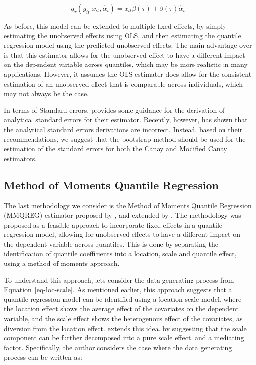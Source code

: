 \documentclass[bib]{statapress}
\begin{document}
\[q_{\tau}(y_{it}|x_{it},\hat \alpha_i) =  x_{it}\beta(\tau)+\beta(\tau) \hat\alpha_i
\]

As before, this model can be extended to multiple fixed effects, by
simply estimating the unobserved effects using OLS, and then estimating
the quantile regression model using the predicted unobserved effects.
The main advantage over \citet{canay2011} is that this estimator allows
for the unobserved effect to have a different impact on the dependent
variable across quantiles, which may be more realistic in many
applications. However, it assumes the OLS estimator does allow for the
consistent estimation of an unobserved effect that is comparable across
individuals, which may not always be the case.

In terms of Standard errors, \citet{canay2011} provides some guidance
for the derivation of analytical standard errors for their estimator.
Recently, however, \citet{besstremyannaya2019} has shown that the
analytical standard errors derivations are incorrect. Instead, based on
their recommendations, we suggest that the bootstrap method should be
used for the estimation of the standard errors for both the Canay and
Modified Canay estimators.

\subsection{\texorpdfstring{Method of Moments Quantile Regression
\citet{mss2019}}{Method of Moments Quantile Regression @mss2019}}\label{sec-mmqr}

The last methodology we consider is the Method of Moments Quantile
Regression (MMQREG) estimator proposed by \citet{mss2019}, and extended
by \citet{riosavila2024}. The methodology was proposed as a feasible
approach to incorporate fixed effects in a quantile regression model,
allowing for unobserved effects to have a different impact on the
dependent variable across quantiles. This is done by separating the
identification of quantile coefficients into a location, scale and
quantile effect, using a method of moments approach.

To understand this approach, lets consider the data generating process
from Equation~\ref{eq-loc-scale}. As mentioned earlier, this approach
suggests that a quantile regression model can be identified using a
location-scale model, where the location effect shows the average effect
of the covariates on the dependent variable, and the scale effect shows
the heterogenous effect of the covariates, as diversion from the
location effect. \citet{mss2019} extends this idea, by suggesting that
the scale component can be further decomposed into a pure scale effect,
and a mediating factor. Specifically, the author considers the case
where the data generating process can be written as:
\end{document}
